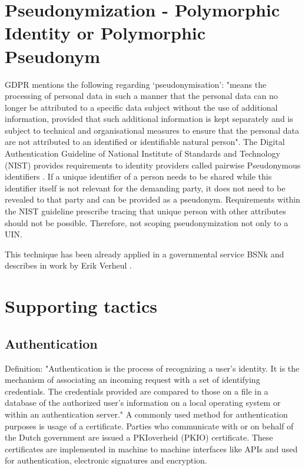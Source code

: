 \section{Pseudonymization - Polymorphic Identity or Polymorphic Pseudonym}
GDPR \cite{GDPR} mentions the following regarding ‘pseudonymisation': "means the processing of personal data in such a manner that the personal data can no longer be attributed to a specific data subject without the use of additional information, provided that such additional information is kept separately and is subject to technical and organisational measures to ensure that the personal data are not attributed to an identified or identifiable natural person". The Digital Authentication Guideline of National Institute of Standards and Technology (NIST) provides requirements to identity providers called pairwise Pseudonymous identifiers \cite{NIST_800-63C}. If a unique identifier of a person needs to be shared while this identifier itself is not relevant for the demanding party, it does not need to be revealed to that party and can be provided as a pseudonym. Requirements within the NIST guideline prescribe tracing that unique person with other attributes should not be possible. Therefore, not scoping pseudonymization not only to a UIN.

This technique has been already applied in a governmental service BSNk \cite{Logius_BSNk} and describes in work by Erik Verheul \cite{VerheuleID}.

\section{Supporting tactics}

\subsection{Authentication} \label{authentication}
Definition: "Authentication is the process of recognizing a user’s identity. It is the mechanism of associating an incoming request with a set of identifying credentials. The credentials provided are compared to those on a file in a database of the authorized user’s information on a local operating system or within an authentication server." \cite{authentication}
A commonly used method for authentication purposes is usage of a certificate. Parties who communicate with or on behalf of the Dutch government are issued a PKIoverheid (PKIO) certificate. These certificates are implemented in machine to machine interfaces like APIs and used for authentication, electronic signatures and encryption. \cite{Logius_PKIO}

